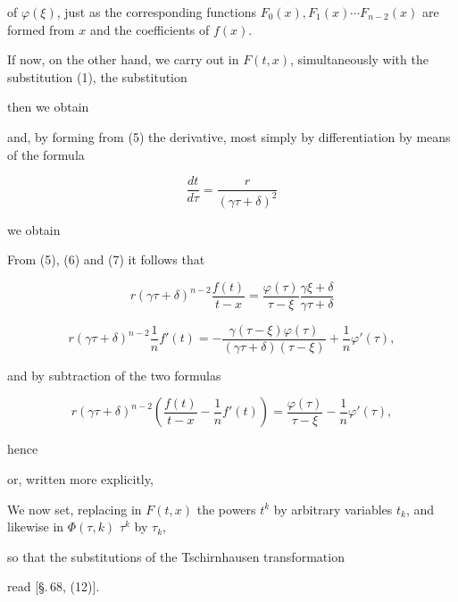 of $\varphi(\xi)$, just as the corresponding functions
$F_0(x), F_1(x) \cdots F_{n-2}(x)$ are formed from $x$ and the coefficients of $f(x)$.

If now, on the other hand, we carry out in $F(t, x)$, simultaneously with the
substitution (1), the substitution


then we obtain


and, by forming from (5) the derivative, most simply by
differentiation by means of the formula

\[
\frac{dt}{d\tau} = \frac{r}{(\gamma\tau+\delta)^2}
\]

we obtain


From (5), (6) and (7) it follows that

\[
r(\gamma\tau+\delta)^{n-2}\frac{f(t)}{t-x} = \frac{\varphi(\tau)}{\tau-\xi}\frac{\gamma\xi+\delta}{\gamma\tau+\delta}
\]

\[
r(\gamma\tau+\delta)^{n-2}\frac{1}{n}f'(t) = -\frac{\gamma(\tau-\xi)\varphi(\tau)}{(\gamma\tau+\delta)(\tau-\xi)} + \frac{1}{n}\varphi'(\tau),
\]

and by subtraction of the two formulas

\[
r(\gamma\tau+\delta)^{n-2}\left(\frac{f(t)}{t-x} - \frac{1}{n}f'(t)\right) = \frac{\varphi(\tau)}{\tau-\xi} - \frac{1}{n}\varphi'(\tau),
\]

hence


or, written more explicitly,


We now set, replacing in $F(t, x)$ the powers $t^k$ by
arbitrary variables $t_k$, and likewise in $\Phi(\tau, k)$ %
$\tau^k$ by $\tau_k$,


so that the substitutions of the Tschirnhausen transformation


read [\S.\,68, (12)].
